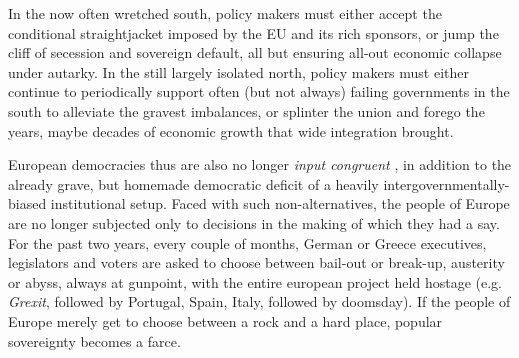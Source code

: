 \documentclass[11pt,a4paper,oneside,openright]{article}
\begin{document}
In the now often wretched south, policy makers must either accept the conditional straightjacket imposed by the \gls{EU} and its rich sponsors, or jump the cliff of secession and sovereign default, all but ensuring all-out economic collapse under autarky. In the still largely isolated north, policy makers must either continue to periodically support often (but not always) failing governments in the south to alleviate the gravest imbalances, or splinter the union and forego the years, maybe decades of economic growth that wide integration brought.

European democracies thus are also no longer \emph{input congruent} \citep{Zurn-2000-aa}, in addition to the already grave, but homemade democratic deficit of a heavily intergovernmentally-biased institutional setup. Faced with such non-alternatives, the people of Europe are no longer subjected only to decisions in the making of which they had a say. For the past two years, every couple of months, German or Greece executives, legislators and voters are asked to choose between bail-out or break-up, austerity or abyss, always at gunpoint, with the entire european project held hostage (e.g. \emph{Grexit}, followed by Portugal, Spain, Italy, followed by doomsday). If the people of Europe merely get to choose between a rock and a hard place, popular sovereignty becomes a farce.
\end{document}
